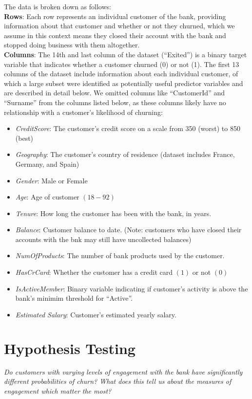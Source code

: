 \documentclass[twoside,twocolumn]{article}
\begin{document}
\noindent The data is broken down as follows:\smallskip\\
\noindent\textbf{Rows}: Each row represents an individual customer of the bank, providing information about that customer and whether or not they churned, which we assume in this context means they closed their account with the bank and stopped doing business with them altogether.\smallskip\\
\noindent\textbf{Columns}: The 14th and last column of the dataset (“Exited”) is a binary target variable that indicates whether a customer churned (0) or not (1). The first 13 columns of the dataset include information about each individual customer, of which a large subset were identified as potentially useful predictor variables and are described in detail below. We omitted columns like “CustomerId” and “Surname” from the columns listed below, as these columns likely have no relationship with a customer’s likelihood of churning:
\begin{itemize}
  \item \textit{CreditScore}: The customer’s credit score on a scale from 350 (worst) to 850 (best)
  \item \textit{Geography}: The customer’s country of residence (dataset includes France, Germany, and Spain)
  \item \textit{Gender}: Male or Female
  \item \textit{Age}: Age of customer $(18-92)$
  \item \textit{Tenure}: How long the customer has been with the bank, in years.
  \item \textit{Balance}: Customer balance to date. (Note: customers who have closed their accounts with the bnk may still have uncollected balances)
  \item \textit{NumOfProducts}: The number of bank products used by the customer.
  \item \textit{HasCrCard}: Whether the customer has a credit card $(1)$ or not $(0)$
  \item \textit{IsActiveMember}: Binary variable indicating if customer's activity is above the bank's minimim threshold for ``Active''.
  \item \textit{Estimated Salary}: Customer's estimated yearly salary.
\end{itemize}

\section{Hypothesis Testing}
\small \textit{Do customers with varying levels of engagement with the bank have significantly different probabilities of churn? What does this tell us about the measures of engagement which matter the most?}\medskip
\end{document}

